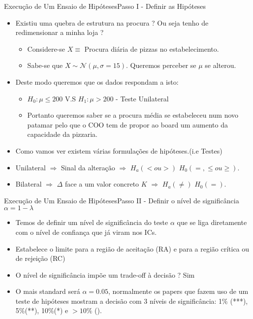 \documentclass[10,5pt, pdf]{beamer}
\begin{document}
\begin{frame}{Execução de Um Ensaio de Hipóteses}{Passo I - Definir as Hipóteses}
\begin{itemize}
    \item{Existiu uma quebra de estrutura na procura ? Ou seja tenho de redimensionar a minha loja ?}
    \begin{itemize}
        \pause
        \item{Considere-se $X\equiv$ Procura diária de pizzas no estabelecimento.}
        \pause
        \item{Sabe-se que $X\sim \mathcal{N}(\mu, \sigma=15)$. Queremos perceber se $\mu$ se alterou.}
    \end{itemize}
    \pause
    \item{Deste modo queremos que os dados respondam a isto:}
    \begin{itemize}
        \pause
        \item{$H_0: \mu \leq 200$ V.S $H_1: \mu > 200$ - Teste Unilateral}
        \pause
        \item{Portanto queremos saber se a procura média se estabeleceu num novo patamar pelo que o COO tem de propor ao board um aumento da capacidade da pizzaria.}
    \end{itemize}
    \item{Como vamos ver existem várias formulações de hipóteses.(i.e Testes)}
    \pause
    \item{Unilateral $\Rightarrow$ Sinal da alteração $\Rightarrow$ $H_a (< ou >)$ $H_0 (=, \leq ou \geq)$.}
    \item{Bilateral $\Rightarrow$ $\Delta$ face a um valor concreto $K$ $\Rightarrow$ $H_a (\neq)$ $H_0(=)$.}
\end{itemize}
\end{frame}

\begin{frame}{Execução de Um Ensaio de Hipóteses}{Passo II - Definir o nível de significância $\alpha=1-\lambda$}
\begin{itemize}
    \item{Temos de definir um nível de significância do teste $\alpha$ que se liga diretamente com o nível de confiança que já viram nos ICs.}
    \pause
    \item{Estabelece o limite para a região de aceitação (RA) e para a região crítica ou de rejeição (RC)}
    \pause
    \item{O nível de significância impõe um trade-off à decisão ? Sim}
    \pause
    \item{O mais standard será $\alpha=0.05$, normalmente os papers que fazem uso de um teste de hipóteses mostram a decisão com 3 níveis de significância: 1\% (***), 5\%(**), 10\%(*) e $>10\%$ ().}
\end{itemize}
\end{frame}
\end{document}
